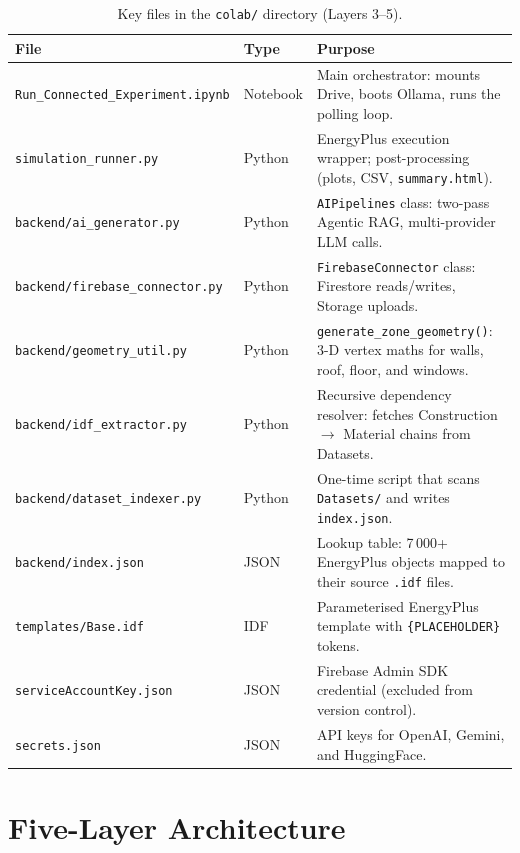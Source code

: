 \documentclass[12pt, a4paper]{article}
\begin{document}
\begin{table}[h!]
\centering
\caption{Key files in the \texttt{colab/} directory (Layers 3--5).}
\label{tab:colab}
\small
\begin{tabular}{@{}llp{6.8cm}@{}}
\toprule
\textbf{File} & \textbf{Type} & \textbf{Purpose} \\
\midrule
\texttt{Run\_Connected\_Experiment.ipynb} & Notebook & Main orchestrator: mounts Drive, boots Ollama, runs the polling loop. \\
\texttt{simulation\_runner.py}            & Python   & EnergyPlus execution wrapper; post-processing (plots, CSV, \texttt{summary.html}). \\
\texttt{backend/ai\_generator.py}         & Python   & \texttt{AIPipelines} class: two-pass Agentic RAG, multi-provider LLM calls. \\
\texttt{backend/firebase\_connector.py}   & Python   & \texttt{FirebaseConnector} class: Firestore reads/writes, Storage uploads. \\
\texttt{backend/geometry\_util.py}        & Python   & \texttt{generate\_zone\_geometry()}: 3-D vertex maths for walls, roof, floor, and windows. \\
\texttt{backend/idf\_extractor.py}        & Python   & Recursive dependency resolver: fetches Construction $\to$ Material chains from Datasets. \\
\texttt{backend/dataset\_indexer.py}      & Python   & One-time script that scans \texttt{Datasets/} and writes \texttt{index.json}. \\
\texttt{backend/index.json}               & JSON     & Lookup table: 7\,000+ EnergyPlus objects mapped to their source \texttt{.idf} files. \\
\texttt{templates/Base.idf}               & IDF      & Parameterised EnergyPlus template with \texttt{\{PLACEHOLDER\}} tokens. \\
\texttt{serviceAccountKey.json}           & JSON     & Firebase Admin SDK credential (excluded from version control). \\
\texttt{secrets.json}                     & JSON     & API keys for OpenAI, Gemini, and HuggingFace. \\
\bottomrule
\end{tabular}
\end{table}

\section{Five-Layer Architecture}
\end{document}
